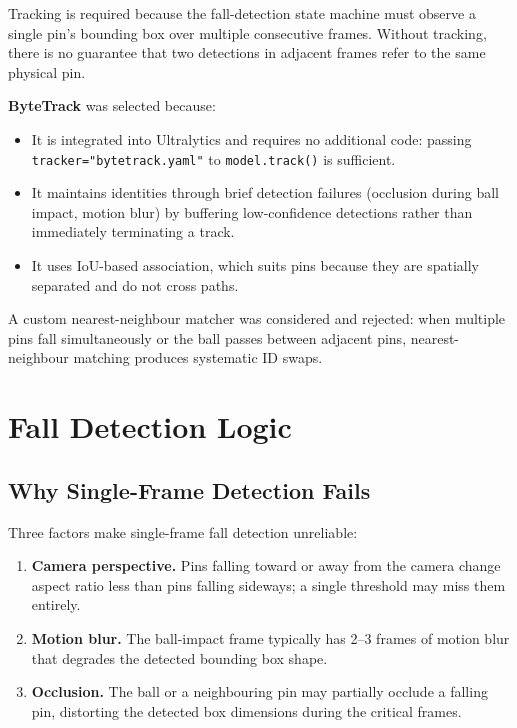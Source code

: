 \documentclass[11pt,a4paper]{article}
\begin{document}
\label{sec:tracking}

Tracking is required because the fall-detection state machine must observe a single pin's bounding box over multiple consecutive frames. Without tracking, there is no guarantee that two detections in adjacent frames refer to the same physical pin.

\textbf{ByteTrack} was selected because:
\begin{itemize}
  \item It is integrated into Ultralytics and requires no additional code: passing \texttt{tracker="bytetrack.yaml"} to \texttt{model.track()} is sufficient.
  \item It maintains identities through brief detection failures (occlusion during ball impact, motion blur) by buffering low-confidence detections rather than immediately terminating a track.
  \item It uses IoU-based association, which suits pins because they are spatially separated and do not cross paths.
\end{itemize}

A custom nearest-neighbour matcher was considered and rejected: when multiple pins fall simultaneously or the ball passes between adjacent pins, nearest-neighbour matching produces systematic ID swaps.

\section{Fall Detection Logic}

\label{sec:fall}

\subsection{Why Single-Frame Detection Fails}

Three factors make single-frame fall detection unreliable:
\begin{enumerate}
  \item \textbf{Camera perspective.} Pins falling toward or away from the camera change aspect ratio less than pins falling sideways; a single threshold may miss them entirely.
  \item \textbf{Motion blur.} The ball-impact frame typically has 2--3 frames of motion blur that degrades the detected bounding box shape.
  \item \textbf{Occlusion.} The ball or a neighbouring pin may partially occlude a falling pin, distorting the detected box dimensions during the critical frames.
\end{enumerate}
\end{document}
